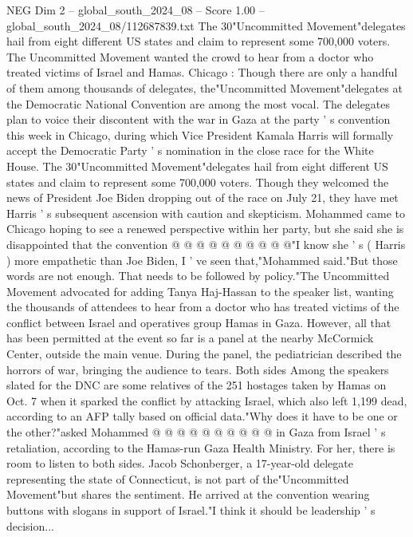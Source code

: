 \begin{textsample}{NEG Dim 2 – global\_south\_2024\_08 – Score 1.00 – global\_south\_2024\_08/112687839.txt}  \label{ex:f2_neg_116}
The 30"Uncommitted Movement"delegates hail from eight different US states and claim to represent some 700,000 voters.
The Uncommitted Movement wanted the crowd to hear from a doctor who treated victims of Israel and Hamas.
Chicago : Though there are only a handful of them among thousands of delegates, the"Uncommitted Movement"delegates at the Democratic National Convention are among the most vocal.
The delegates plan to voice their discontent with the war in Gaza at the party ' s convention this week in Chicago, during which Vice President Kamala Harris will formally accept the Democratic Party ' s nomination in the close race for the White House.
The 30"Uncommitted Movement"delegates hail from eight different US states and claim to represent some 700,000 voters.
Though they welcomed the news of President Joe Biden dropping out of the race on July 21, they have met Harris ' s subsequent ascension with caution and skepticism.
Mohammed came to Chicago hoping to see a renewed perspective within her party, but she said she is disappointed that the convention @ @ @ @ @ @ @ @ @ @"I know she ' s ( Harris ) more empathetic than Joe Biden, I ' ve seen that,"Mohammed said."But those words are not enough.
That needs to be followed by policy."The Uncommitted Movement advocated for adding Tanya Haj-Hassan to the speaker list, wanting the thousands of attendees to hear from a doctor who has treated victims of the conflict between Israel and operatives group Hamas in Gaza.
However, all that has been permitted at the event so far is a panel at the nearby McCormick Center, outside the main venue.
During the panel, the pediatrician described the horrors of war, bringing the audience to tears.
Both sides Among the speakers slated for the DNC are some relatives of the 251 hostages taken by Hamas on Oct. 7 when it sparked the conflict by attacking Israel, which also left 1,199 dead, according to an AFP tally based on official data."Why does it have to be one or the other?"asked Mohammed @ @ @ @ @ @ @ @ @ @ in Gaza from Israel ' s retaliation, according to the Hamas-run Gaza Health Ministry.
For her, there is room to listen to both sides.
Jacob Schonberger, a 17-year-old delegate representing the state of Connecticut, is not part of the"Uncommitted Movement"but shares the sentiment.
He arrived at the convention wearing buttons with slogans in support of Israel."I think it should be leadership ' s decision...

\end{textsample}
